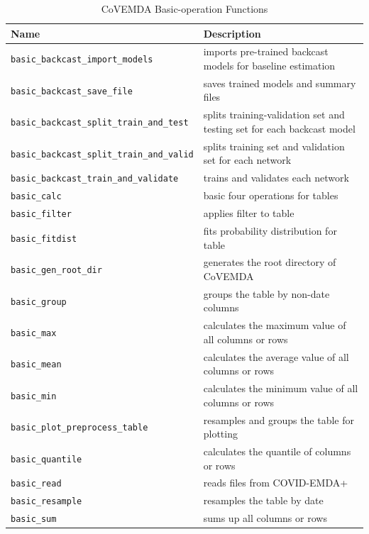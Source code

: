 \documentclass[10pt]{article}
\newcommand{\covemda}{CoVEMDA}
\numberwithin{equation}{section}
\numberwithin{table}{section}
\numberwithin{figure}{section}
\begin{document}
\begin{appendices}
\begin{table}[!ht]
    \centering
    \begin{threeparttable}
    \caption{\covemda{} Basic-operation Functions}
    \label{tab:basic_op_func}
    \footnotesize
    \begin{tabular}{ll}
        \toprule
        Name & Description \\
        \midrule
        \verb!basic_backcast_import_models! & imports pre-trained backcast models for baseline estimation \\
        \verb!basic_backcast_save_file! & saves trained models and summary files \\
        \verb!basic_backcast_split_train_and_test! & splits training-validation set and testing set for each backcast model \\
        \verb!basic_backcast_split_train_and_valid! & splits training set and validation set for each network \\
        \verb!basic_backcast_train_and_validate! & trains and validates each network \\
        \verb!basic_calc! & basic four operations for tables \\
        \verb!basic_filter! & applies filter to table \\
        \verb!basic_fitdist! & fits probability distribution for table \\
        \verb!basic_gen_root_dir! & generates the root directory of \covemda{} \\
        \verb!basic_group! & groups the table by non-date columns \\
        \verb!basic_max! & calculates the maximum value of all columns or rows \\
        \verb!basic_mean! & calculates the average value of all columns or rows \\
        \verb!basic_min! & calculates the minimum value of all columns or rows \\
        \verb!basic_plot_preprocess_table! & resamples and groups the table for plotting \\
        \verb!basic_quantile! & calculates the quantile of columns or rows \\
        \verb!basic_read! & reads files from COVID-EMDA+ \\
        \verb!basic_resample! & resamples the table by date \\
        \verb!basic_sum! & sums up all columns or rows \\
        \bottomrule
    \end{tabular}
    \end{threeparttable}
\end{table}

\end{appendices}




\newpage
\label{sec:ref}


\end{document}

